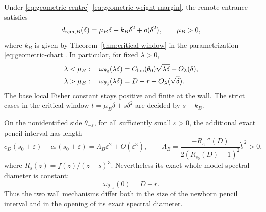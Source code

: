 \begin{theorem}\label{thm:geometric-wall}
Under \eqref{eq:geometric-centre}--\eqref{eq:geometric-weight-margin},
the remote entrance satisfies
\begin{equation}\label{eq:geometric-entrance}
 d_{{\rm rem},B}(\delta)=\mu_B\delta+k_B\delta^2+o(\delta^2),
 \qquad\mu_B>0,
\end{equation}
where $k_B$ is given by Theorem~\ref{thm:critical-window} in the
parametrization \eqref{eq:geometric-chart}. In particular, for fixed
$\lambda>0$,
\begin{align}
 \lambda<\mu_B:\quad
 \omega_{\theta_\delta}(\lambda\delta)
 &=C_{\mathrm{loc}}(\theta_0)\sqrt{\lambda\delta}+O_\lambda(\delta),
                                                        \label{eq:B-below}\\
 \lambda>\mu_B:\quad
 \omega_{\theta_\delta}(\lambda\delta)
 &=D-r+O_\lambda(\sqrt\delta).                         \label{eq:B-above}
\end{align}
The base local Fisher constant stays positive and finite at the wall.
The strict cases in the critical window
$t=\mu_B\delta+s\delta^2$ are decided by $s-k_B$.

On the nonidentified side $\theta_{-\varepsilon}$, for all sufficiently
small $\varepsilon>0$, the additional exact pencil interval has length
\begin{equation}\label{eq:B-pencil-opening}
 c_D(s_0+\varepsilon)-c_*(s_0+\varepsilon)
       =\Lambda_B\varepsilon^2+O(\varepsilon^3),\qquad
 \Lambda_B=\frac{-R_{s_0}''(D)}{2(R_{s_0}(D)-1)^2}\dot b^{\,2}>0,
\end{equation}
where $R_s(z)=f(z)/(z-s)^3$. Nevertheless its exact whole-model
spectral diameter is constant:
\begin{equation}\label{eq:B-exact-diameter}
 \omega_{\theta_{-\varepsilon}}(0)=D-r.
\end{equation}
Thus the two wall mechanisms differ both in the size of the newborn
pencil interval and in the opening of its exact spectral diameter.
\end{theorem}
